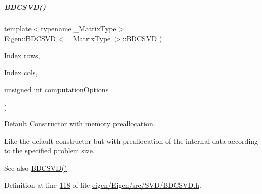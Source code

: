 \mbox{\label{group___s_v_d___module_a3e1fa48b3d042b7daf7392724a68bb60}} 
\subparagraph{\texorpdfstring{B\+D\+C\+S\+V\+D()}{BDCSVD()}\hspace{0.1cm}{\footnotesize\ttfamily [2/6]}}
{\footnotesize\ttfamily template$<$typename \+\_\+\+Matrix\+Type$>$ \\
\hyperlink{group___s_v_d___module_class_eigen_1_1_b_d_c_s_v_d}{Eigen\+::\+B\+D\+C\+S\+VD}$<$ \+\_\+\+Matrix\+Type $>$\+::\hyperlink{group___s_v_d___module_class_eigen_1_1_b_d_c_s_v_d}{B\+D\+C\+S\+VD} (\begin{DoxyParamCaption}\item[{\hyperlink{group___s_v_d___module_a6229a37997eca1072b52cca5ee7a2bec}{Index}}]{rows,  }\item[{\hyperlink{group___s_v_d___module_a6229a37997eca1072b52cca5ee7a2bec}{Index}}]{cols,  }\item[{unsigned int}]{computation\+Options = {} }\end{DoxyParamCaption})\hspace{0.3cm}{\ttfamily [inline]}}



Default Constructor with memory preallocation. 

Like the default constructor but with preallocation of the internal data according to the specified problem size. \begin{DoxySeeAlso}{See also}
\hyperlink{group___s_v_d___module_a39514816d38f9c418cf3f3514b511c2c}{B\+D\+C\+S\+V\+D()} 
\end{DoxySeeAlso}


Definition at line \hyperlink{eigen_2_eigen_2src_2_s_v_d_2_b_d_c_s_v_d_8h_source_l00118}{118} of file \hyperlink{eigen_2_eigen_2src_2_s_v_d_2_b_d_c_s_v_d_8h_source}{eigen/\+Eigen/src/\+S\+V\+D/\+B\+D\+C\+S\+V\+D.\+h}.

